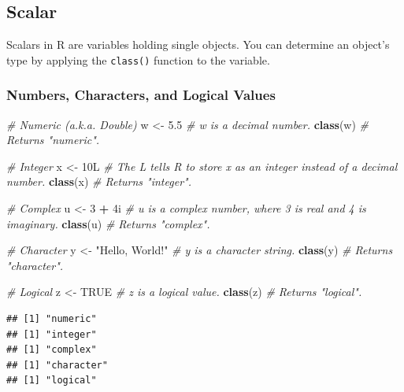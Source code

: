 \documentclass[
]{book}
\newenvironment{Shaded}{\begin{snugshade}}{\end{snugshade}}
\newcommand{\CommentTok}[1]{\textcolor[rgb]{0.56,0.35,0.01}{\textit{#1}}}
\newcommand{\ConstantTok}[1]{\textcolor[rgb]{0.56,0.35,0.01}{#1}}
\newcommand{\DecValTok}[1]{\textcolor[rgb]{0.00,0.00,0.81}{#1}}
\newcommand{\FloatTok}[1]{\textcolor[rgb]{0.00,0.00,0.81}{#1}}
\newcommand{\FunctionTok}[1]{\textcolor[rgb]{0.13,0.29,0.53}{\textbf{#1}}}
\newcommand{\NormalTok}[1]{#1}
\newcommand{\OtherTok}[1]{\textcolor[rgb]{0.56,0.35,0.01}{#1}}
\newcommand{\SpecialCharTok}[1]{\textcolor[rgb]{0.81,0.36,0.00}{\textbf{#1}}}
\newcommand{\StringTok}[1]{\textcolor[rgb]{0.31,0.60,0.02}{#1}}
\begin{document}
\hypertarget{scalar}{%
\subsection{Scalar}\label{scalar}}

Scalars in R are variables holding single objects. You can determine an object's type by applying the \texttt{class()} function to the variable.

\hypertarget{numbers-characters-and-logical-values}{%
\subsubsection*{Numbers, Characters, and Logical Values}\label{numbers-characters-and-logical-values}}

\begin{Shaded}
\begin{Highlighting}[]
\CommentTok{\# Numeric (a.k.a. Double)}
\NormalTok{w }\OtherTok{\textless{}{-}} \FloatTok{5.5}  \CommentTok{\# w is a decimal number.}
\FunctionTok{class}\NormalTok{(w)  }\CommentTok{\# Returns "numeric".}

\CommentTok{\# Integer}
\NormalTok{x }\OtherTok{\textless{}{-}}\NormalTok{ 10L  }\CommentTok{\# The L tells R to store x as an integer instead of a decimal number.}
\FunctionTok{class}\NormalTok{(x)  }\CommentTok{\# Returns "integer".}

\CommentTok{\# Complex}
\NormalTok{u }\OtherTok{\textless{}{-}} \DecValTok{3} \SpecialCharTok{+}\NormalTok{ 4i }\CommentTok{\# u is a complex number, where 3 is real and 4 is imaginary.}
\FunctionTok{class}\NormalTok{(u)  }\CommentTok{\# Returns "complex".}

\CommentTok{\# Character}
\NormalTok{y }\OtherTok{\textless{}{-}} \StringTok{"Hello, World!"}  \CommentTok{\# y is a character string.}
\FunctionTok{class}\NormalTok{(y)  }\CommentTok{\# Returns "character".}

\CommentTok{\# Logical}
\NormalTok{z }\OtherTok{\textless{}{-}} \ConstantTok{TRUE}  \CommentTok{\# z is a logical value.}
\FunctionTok{class}\NormalTok{(z)  }\CommentTok{\# Returns "logical".}
\end{Highlighting}
\end{Shaded}

\begin{verbatim}
## [1] "numeric"
## [1] "integer"
## [1] "complex"
## [1] "character"
## [1] "logical"
\end{verbatim}
\end{document}
